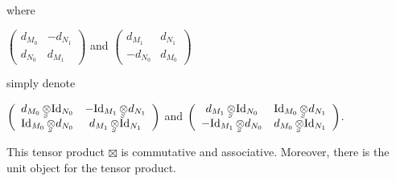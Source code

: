 \documentclass[10pt]{amsart}
\theoremstyle{break}
\begin{document}
where 
\begin{center}
$\left(
		\begin{array}{cc}
			d_{M_0}&-d_{N_1}\\
			d_{N_0}&d_{M_1}
		\end{array}
	    \right)$ 
and
$\left(
		\begin{array}{cc}
			d_{M_1}&d_{N_1}\\
			-d_{N_0}&d_{M_0}
		\end{array}
	    \right) $
\end{center}
simply denote 
\begin{center}
$\left(
		\begin{array}{cc}
			d_{M_0} {{\,\otimes\hspace{-0.7em}\raisebox{-0.5ex}{${}_{{}_{S}}$}\,}} {{\mathrm{Id}}}_{N_0}&- {{\mathrm{Id}}}_{M_1}{{\,\otimes\hspace{-0.7em}\raisebox{-0.5ex}{${}_{{}_{S}}$}\,}} d_{N_1}\\
			{{\mathrm{Id}}}_{M_0}{{\,\otimes\hspace{-0.7em}\raisebox{-0.5ex}{${}_{{}_{S}}$}\,}} d_{N_0}&d_{M_1}{{\,\otimes\hspace{-0.7em}\raisebox{-0.5ex}{${}_{{}_{S}}$}\,}} {{\mathrm{Id}}}_{N_1}
		\end{array}
	    \right)$ 
and
$\left(
		\begin{array}{cc}
			d_{M_1}{{\,\otimes\hspace{-0.7em}\raisebox{-0.5ex}{${}_{{}_{S}}$}\,}} {{\mathrm{Id}}}_{N_0}&{{\mathrm{Id}}}_{M_0}{{\,\otimes\hspace{-0.7em}\raisebox{-0.5ex}{${}_{{}_{S}}$}\,}} d_{N_1}\\
			-{{\mathrm{Id}}}_{M_1}{{\,\otimes\hspace{-0.7em}\raisebox{-0.5ex}{${}_{{}_{S}}$}\,}} d_{N_0}&d_{M_0}{{\,\otimes\hspace{-0.7em}\raisebox{-0.5ex}{${}_{{}_{S}}$}\,}} {{\mathrm{Id}}}_{N_1}
		\end{array}
	    \right) $.
\end{center}

\indent
This tensor product $\boxtimes$ is commutative and associative. Moreover, there is the unit object for the tensor product.\\
\end{document}
